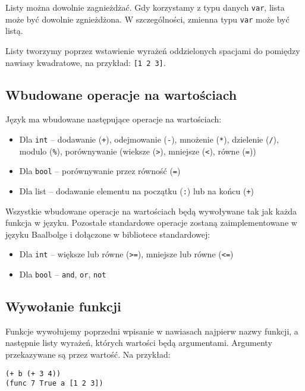 \documentclass{article}
\begin{document}
Listy można dowolnie zagnieżdżać. Gdy korzystamy z typu danych \texttt{var}, lista może być dowolnie zgnieżdżona. W szczególności, zmienna typu \texttt{var} może być listą.

Listy tworzymy poprzez wstawienie wyrażeń oddzielonych spacjami do pomiędzy nawiasy kwadratowe, na przykład: \texttt{[1 2 3]}.

\subsection{Wbudowane operacje na wartościach}

Język ma wbudowane następujące operacje na wartościach:

\begin{itemize}
    \item Dla \texttt{int} -- dodawanie (\texttt{+}), odejmowanie (\texttt{-}), mnożenie (\texttt{*}), dzielenie (\texttt{/}), modulo (\texttt{\%}), porównywanie (wieksze (\texttt{>}), mniejsze (\texttt{<}), równe (\texttt{=}))
    \item Dla \texttt{bool} -- porównywanie przez równość (\texttt{=})
    \item Dla list -- dodawanie elementu na początku (\texttt{:}) lub na końcu (\texttt{+})
\end{itemize}

Wszystkie wbudowane operacje na wartościach będą wywoływane tak jak każda funkcja w języku. Pozostałe standardowe operacje zostaną zaimplementowane w języku Baalbolge i dołączone w bibliotece standardowej:

\begin{itemize}
    \item Dla \texttt{int} -- większe lub równe (\texttt{>=}), mniejsze lub równe (\texttt{<=})
    \item Dla \texttt{bool} -- \texttt{and}, \texttt{or}, \texttt{not}
\end{itemize}

\subsection{Wywołanie funkcji}\label{func:call}

Funkcje wywołujemy poprzedni wpisanie w nawiasach najpierw nazwy funkcji, a następnie listy wyrażeń, których wartości będą argumentami. Argumenty przekazywane są przez wartość. Na przykład:

\begin{lstlisting}
(+ b (+ 3 4))
(func 7 True a [1 2 3])
\end{lstlisting}
\end{document}
